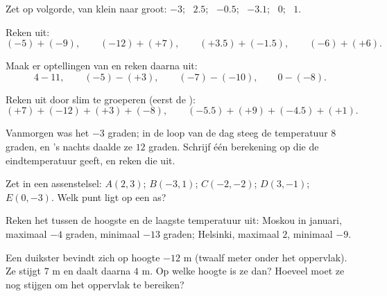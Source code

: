 \begin{exercise}[$\star$]\label{exo:g7:negatives:3}
Zet op volgorde, van klein naar groot: $-3$; \ $2.5$; \ $-0.5$; \ $-3.1$;
\ $0$; \ $1$.
\end{exercise}

\begin{exercise}[$\star$]\label{exo:g7:negatives:4}
Reken uit:
\[
(-5) + (-9), \qquad
(-12) + (+7), \qquad
(+3.5) + (-1.5), \qquad
(-6) + (+6).
\]
\end{exercise}

\begin{exercise}[$\star$]\label{exo:g7:negatives:5}
Maak er optellingen van en reken daarna uit:
\[
4 - 11, \qquad
(-5) - (+3), \qquad
(-7) - (-10), \qquad
0 - (-8).
\]
\end{exercise}

\begin{exercise}[$\star$]\label{exo:g7:negatives:6}
Reken uit door slim te groeperen (eerst de ):
\[
(+7) + (-12) + (+3) + (-8), \qquad
(-5.5) + (+9) + (-4.5) + (+1).
\]
\end{exercise}

\begin{exercise}[$\star$]\label{exo:g7:negatives:7}
Vanmorgen was het $-3$ graden; in de loop van de dag steeg de temperatuur $8$
graden, en 's nachts daalde ze $12$ graden. Schrijf één berekening op die de
eindtemperatuur geeft, en reken die uit.
\end{exercise}

\begin{exercise}[$\star$]\label{exo:g7:negatives:8}
Zet in een assenstelsel: $A(2, 3)$; $B(-3, 1)$; $C(-2, -2)$; $D(3, -1)$;
$E(0, -3)$. Welk punt ligt op een as?
\end{exercise}

\begin{exercise}[$\star\star$]\label{exo:g7:negatives:9}
Reken het  tussen de hoogste en de laagste temperatuur uit: Moskou in
januari, maximaal $-4$ graden, minimaal $-13$ graden; Helsinki, maximaal $2$,
minimaal $-9$.
\end{exercise}

\begin{exercise}[$\star\star$]\label{exo:g7:negatives:10}
Een duikster bevindt zich op hoogte $-12$ m (twaalf meter onder het oppervlak).
Ze stijgt $7$ m en daalt daarna $4$ m. Op welke hoogte is ze dan? Hoeveel moet ze
nog stijgen om het oppervlak te bereiken?
\end{exercise}


